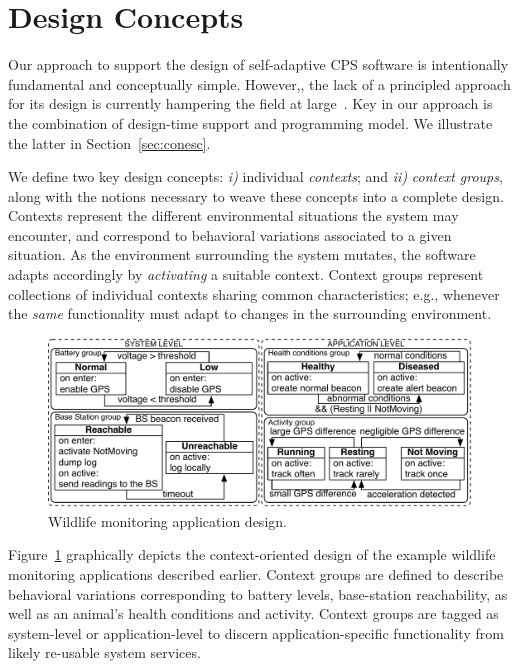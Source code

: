 \section{Design Concepts}
\label{sec:design}

Our approach to support the design of self-adaptive CPS software is
intentionally fundamental and conceptually simple. However,, the lack
of a principled approach for its design is currently hampering the
field at large~\cite{Picco:2010:SEW:1882362.1882421}. Key in our
approach is the combination of design-time support and programming
model. We illustrate the latter in Section~\ref{sec:conesc}.

We define two key design concepts: \emph{i)} individual
\emph{contexts}; and \emph{ii)} \emph{context groups}, along with the
notions necessary to weave these concepts into a complete design.
Contexts represent the different environmental situations the system
may encounter, and correspond to behavioral variations associated to a
given situation. As the environment surrounding the system mutates,
the software adapts accordingly by \emph{activating} a suitable
context. Context groups represent collections of individual contexts
sharing common characteristics; e.g., whenever the \emph{same}
functionality must adapt to changes in the surrounding environment.

\begin{figure}
\begin{center}
\includegraphics[scale=.45]{imgs/wildlifetracking}
\vspace{-4mm}
\caption{Wildlife monitoring application design.}
  \label{fig:design}
\vspace{-6mm}
\end{center}
\end{figure}

Figure~\ref{fig:design} graphically depicts the context-oriented
design of the example wildlife monitoring applications described
earlier. Context groups are defined to describe behavioral variations
corresponding to battery levels, base-station reachability, as well as
an animal's health conditions and activity. Context groups are tagged
as system-level or application-level to discern application-specific
functionality from likely re-usable system services.

